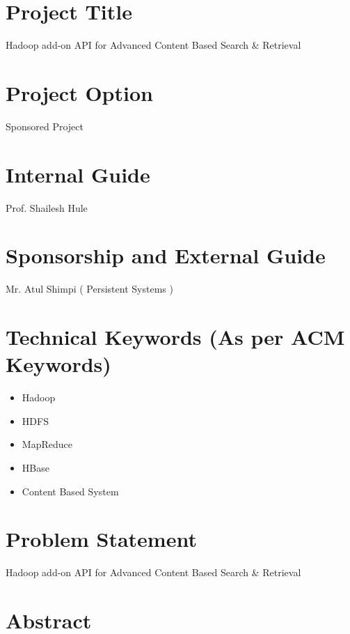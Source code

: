 \documentclass[oneside,a4paper,12pt]{report}
\begin{document}
\section{Project Title}
Hadoop add-on API for Advanced Content Based Search \& Retrieval

\section{ Project Option }
Sponsored Project

\section{Internal Guide}
Prof. Shailesh Hule 

\section{ Sponsorship and External Guide} 
Mr. Atul Shimpi ( Persistent Systems ) 


\section{Technical Keywords (As per ACM Keywords)}
\begin{itemize}
\item Hadoop
\item HDFS
\item MapReduce
\item HBase
\item Content Based System
\end{itemize}



\section{Problem Statement}
\label{sec:problem}
Hadoop add-on API for Advanced Content Based Search \& Retrieval

\section{Abstract}
\end{document}
